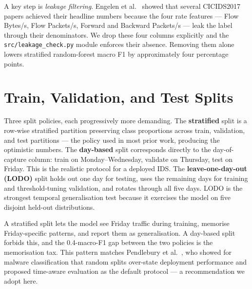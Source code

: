 A key step is \textit{leakage filtering}. Engelen et al.~\cite{Engelen2021}
showed that several CICIDS2017 papers achieved their headline numbers
because the four rate features --- Flow Bytes/s, Flow Packets/s, Forward
and Backward Packets/s --- leak the label through their denominators. We
drop these four columns explicitly and the \texttt{src/leakage\_check.py}
module enforces their absence. Removing them alone lowers stratified
random-forest macro F1 by approximately four percentage points.
\label{sec:leakage}

\section{Train, Validation, and Test Splits}

Three split policies, each progressively more demanding. The
\textbf{stratified} split is a row-wise stratified partition preserving
class proportions across train, validation, and test partitions --- the
policy used in most prior work, producing the optimistic numbers. The
\textbf{day-based} split corresponds directly to the day-of-capture
column: train on Monday--Wednesday, validate on Thursday, test on Friday.
This is the realistic protocol for a deployed IDS. The
\textbf{leave-one-day-out (LODO)} split holds out one day for testing,
uses the remaining days for training and threshold-tuning validation, and
rotates through all five days. LODO is the strongest temporal
generalisation test because it exercises the model on five disjoint
held-out distributions.

A stratified split lets the model see Friday traffic during training,
memorise Friday-specific patterns, and report them as generalisation. A
day-based split forbids this, and the 0.4-macro-F1 gap between the two
policies is the memorisation tax. This pattern matches Pendlebury et
al.~\cite{Pendlebury2019}, who showed for malware classification that
random splits over-state deployment performance and proposed time-aware
evaluation as the default protocol --- a recommendation we adopt here.
